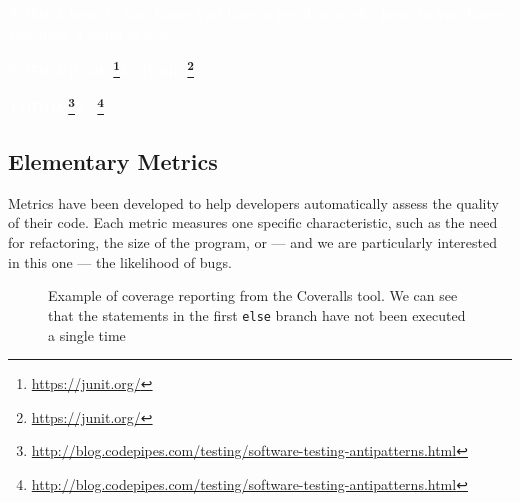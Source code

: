 \documentclass[11pt]{sdm_internship}
\newcommand{\todo}[1]{\colorbox{Red!75}{\textcolor{white}{\textbf{TODO\ifx&#1&\else: #1\fi}}}}
\theoremstyle{definition}
\begin{document}
\todo{how do you know you have a good oracle}

\todo{jUnit~\footnote{\url{https://junit.org/}}}

\todo{\footnote{\url{http://blog.codepipes.com/testing/software-testing-antipatterns.html}}}

\subsection{Elementary Metrics}%
\label{ssec:elementary_metrics}
Metrics have been developed to help developers automatically assess the quality of their code.
Each metric measures one specific characteristic, such as the need for refactoring, the size of the program, or --- and we are particularly interested in this one --- the likelihood of bugs.

\begin{figure}
  \centering
  \cprotect\caption{Example of coverage reporting from the Coveralls\protect\footnotemark{} tool. We can see that the statements in the first \texttt{else} branch have not been executed a single time}%
  \label{fig:screenshot_coverage}
\end{figure}
\end{document}
